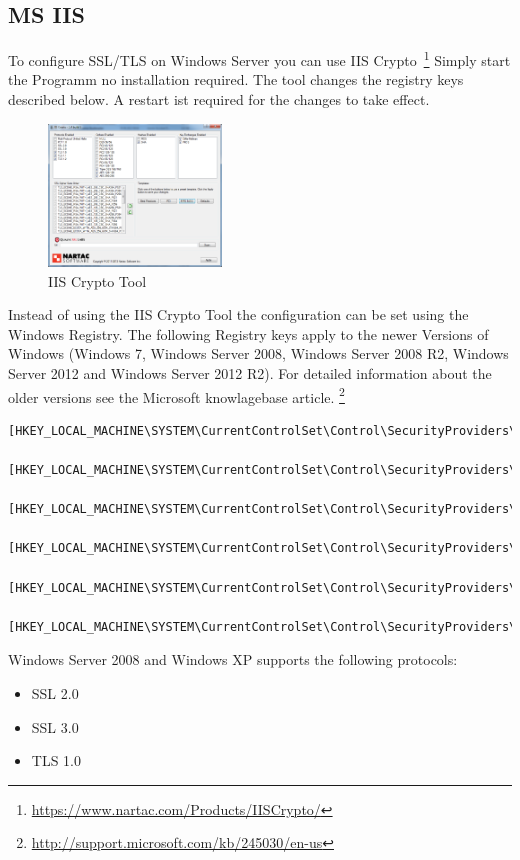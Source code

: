 \subsection{MS IIS}
\label{sec:ms-iis}

To configure SSL/TLS on Windows Server you can use IIS Crypto~\footnote{\url{https://www.nartac.com/Products/IISCrypto/}}
Simply start the Programm no installation required. The tool changes the registry keys described below.
A restart ist required for the changes to take effect.

\begin{figure}[p]
  \centering
  \includegraphics[width=0.411\textwidth]{img/IISCryptoFIPS1402.png}
  \caption{IIS Crypto Tool}
  \label{fig:IISCryptoFIPS1402}
\end{figure}

Instead of using the IIS Crypto Tool the configuration can be set
using the Windows Registry. The following Registry keys apply to the
newer Versions of Windows (Windows 7, Windows Server 2008, Windows
Server 2008 R2, Windows Server 2012 and Windows Server 2012 R2). For detailed
information about the older versions see the Microsoft knowlagebase
article. \footnote{\url{http://support.microsoft.com/kb/245030/en-us}}
\begin{lstlisting}[breaklines]
  [HKEY_LOCAL_MACHINE\SYSTEM\CurrentControlSet\Control\SecurityProviders\Schannel] 
  [HKEY_LOCAL_MACHINE\SYSTEM\CurrentControlSet\Control\SecurityProviders\Schannel\Ciphers] 
  [HKEY_LOCAL_MACHINE\SYSTEM\CurrentControlSet\Control\SecurityProviders\Schannel\CipherSuites] 
  [HKEY_LOCAL_MACHINE\SYSTEM\CurrentControlSet\Control\SecurityProviders\Schannel\Hashes] 
  [HKEY_LOCAL_MACHINE\SYSTEM\CurrentControlSet\Control\SecurityProviders\Schannel\KeyExchangeAlgorithms] 
  [HKEY_LOCAL_MACHINE\SYSTEM\CurrentControlSet\Control\SecurityProviders\Schannel\Protocols] 
\end{lstlisting}

Windows Server 2008 and Windows XP supports the following protocols:
\begin{itemize}
\item SSL 2.0
\item SSL 3.0
\item TLS 1.0
\end{itemize}

